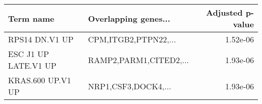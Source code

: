 \begin{tabular}{llr}
\toprule
           Term name &   Overlapping genes... &  Adjusted p-value \\
\midrule
      RPS14 DN.V1 UP &   CPM,ITGB2,PTPN22,... &          1.52e-06 \\
ESC J1 UP LATE.V1 UP & RAMP2,PARM1,CITED2,... &          1.93e-06 \\
   KRAS.600 UP.V1 UP &    NRP1,CSF3,DOCK4,... &          1.93e-06 \\
\bottomrule
\end{tabular}
